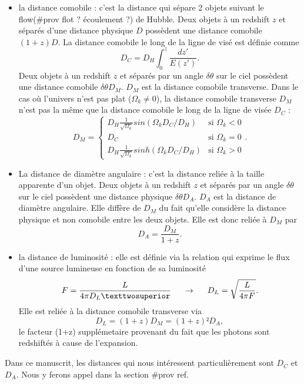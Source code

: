 \documentclass[11pt, twoside, a4paper, openright]{report}
\begin{document}
\begin{itemize}[label=$\bullet$]
\item la distance comobile : c'est la distance qui sépare 2 objets suivant le flow(\#prov flot ? écoulement ?) de Hubble. Deux objets à un redshift $z$ et séparés d'une distance physique $D$ possèdent une distance comobile $(1+z)D$. La distance comobile le long de la ligne de visé est définie comme
  \begin{equation}
    \label{eq:dist_como}
    D_{C} = D_H \int_0^z \frac{dz'}{E(z')} .
  \end{equation}
  Deux objets à un redshift $z$ et séparés par un angle $\delta \theta$ sur le ciel possèdent une distance comobile $\delta \theta D_M$. $D_M$ est la distance comobile transverse. 
  Dans le cas où l'univers n'est pas plat ($\Omega_k \neq 0$), la distance comobile transverse $D_M$  n'est pas la même que la distance comobile le long de la ligne de visée $D_{C}$ :
  \begin{equation}
    \label{eq:dist_como_trans}
    D_M = \left\{
      \begin{array}{ll}
        D_H \frac{1}{\sqrt{\Omega_k}} sin(\Omega_k D_C / D_H) & \mbox{si } \Omega_k < 0 \\
        D_C & \textrm{si } \Omega_k = 0 \\
        D_H \frac{1}{\sqrt{\Omega_k}} sinh(\Omega_k D_C / D_H) & \mbox{si } \Omega_k > 0
      \end{array}
    \right..
  \end{equation}
  
\item La distance de diamètre angulaire : c'est la distance reliée à la taille apparente d'un objet. Deux objets à un redshift $z$ et séparés par un angle $\delta \theta$ sur le ciel possèdent une distance physique $\delta \theta D_A$. $D_A$ est la distance de diamètre angulaire. Elle diffère de $D_M$ du fait qu'elle considère la distance physique et non comobile entre les deux objets. Elle est donc reliée à $D_M$ par
  \begin{equation}
    \label{eq:dist_ang}
    D_A = \frac{D_M}{1+z}.
  \end{equation}

\item la distance de luminosité : elle est définie via la relation qui exprime le flux d'une source lumineuse en fonction de sa luminosité
  \begin{equation}
    \label{eq:dist_lum}
    F = \frac{L}{4\pi D_L²} \hspace{0.5cm} \rightarrow \hspace{0.5cm} D_L = \sqrt{\frac{L}{4 \pi F}} .
  \end{equation}
  Elle est reliée à la distance comobile transverse via
  \begin{equation}
    D_L = (1+z) D_M = (1+z)² D_A ,
  \end{equation}
  le facteur (1+z) supplémetaire provenant du fait que les photons sont redshiftés à cause de l'expansion.
\end{itemize}
Dans ce manuscrit, les distances qui nous intéressent particulièrement sont $D_C$ et $D_A$. Nous y ferons appel dans la section \#prov ref.
\end{document}
